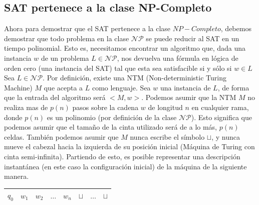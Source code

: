 \documentclass[a4paper]{article}
\begin{document}
\subsection{SAT pertenece a la clase NP-Completo}
Ahora para demostrar que el SAT pertenece a la clase $NP-Completo$, debemos demostrar que todo problema en la clase $\mathcal{NP}$ se puede reducir al SAT en un tiempo polinomial. Esto es, necesitamos encontrar un algoritmo que, dada una instancia $w$ de un problema $L \in \mathcal{NP}$, nos devuelva una fórmula en lógica de orden cero (una instancia del SAT) tal que esta sea satisfacible si y sólo si $w\in L$\\


Sea $L \in \mathcal{NP}$. Por definición, existe una NTM (Non-deterministic Turing Machine) $M$ que acepta a $L$ como lenguaje. Sea $w$ una instancia de $L$, de forma que la entrada del algoritmo será $<M,w>$. Podemos asumir que la NTM $M$ no realiza mas de $p(n)$ pasos sobre la cadena $w$ de longitud $n$ en cualquier rama, donde $p(n)$ es un polinomio (por definición de la clase $\mathcal{NP}$). Esto significa que podemos asumir que el tamaño de la cinta utilizado será de a lo más, $p(n)$ celdas. También podemos asumir que $M$ nunca escribe el símbolo $\sqcup$, y nunca mueve el cabezal hacia la izquierda de su posición inicial (Máquina de Turing con cinta semi-infinita).
Partiendo de esto, es posible representar una descripción instantánea (en este caso la configuración inicial) de la máquina de la siguiente manera.

\begin{table}
  \begin{center}
    \begin{tabular}{| c | c | c | C{2cm} | c | c | C{4cm} | c |}
      \hline
      $q_0$ & $w_1$ & $w_2$ & $\dots$ & $w_n$ & $\sqcup$ & $\dots$ & $\sqcup$\\
      \hline
    \end{tabular}
  \end{center}
\end{table}
\end{document}

